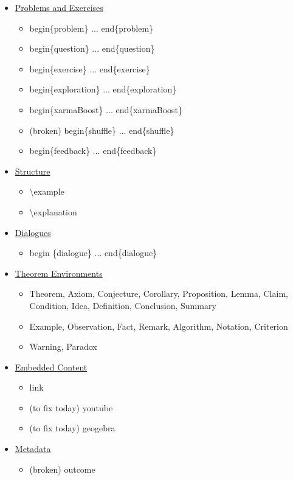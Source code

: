\documentclass{ximera}
\begin{document}
\begin{remark}
\begin{itemize}
\item \hyperref[ProblemContainers]{Problems and Exercises}
  \begin{itemize}
    \item begin\{problem\} ... end\{problem\}
    \item begin\{question\} ... end\{question\}
    \item begin\{exercise\} ... end\{exercise\}
    \item begin\{exploration\} ... end\{exploration\}
    \item begin\{xarmaBoost\} ... end\{xarmaBoost\}
    \item (broken) begin\{shuffle\} ... end\{shuffle\}
    \item begin\{feedback\} ... end\{feedback\}
  \end{itemize}
\item \hyperref[StructuralEnvironments]{Structure}
  \begin{itemize}
    \item \textbackslash example
    \item \textbackslash explanation
  \end{itemize}
\item \hyperref[Dialogue]{Dialogues}
  \begin{itemize}
    \item begin \{dialogue\} ... end\{dialogue\}
  \end{itemize}
\item \hyperref[TheoremEnvironments]{Theorem Environments}
  \begin{itemize}
    \item Theorem, Axiom, Conjecture, Corollary, Proposition, Lemma, Claim, Condition, Idea, Definition, Conclusion, Summary
    \item Example, Observation, Fact, Remark, Algorithm, Notation, Criterion
    \item Warning, Paradox
  \end{itemize}
\item \hyperref[EmbeddedContent]{Embedded Content}
  \begin{itemize}
    \item link
    \item (to fix today) youtube
    \item (to fix today) geogebra
  \end{itemize}
\item \hyperref[Metadata]{Metadata}
  \begin{itemize}
    \item (broken) outcome
  \end{itemize}

\end{itemize}

\end{remark}
\end{document}
